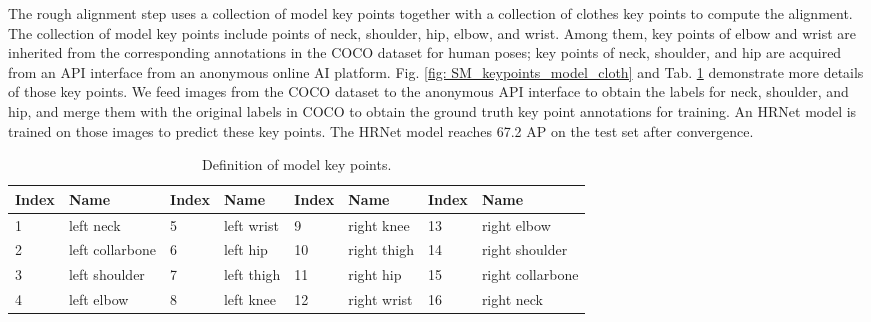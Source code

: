 \documentclass[10pt,twocolumn,letterpaper]{article}
\begin{document}
The rough alignment step uses a collection of model key points together with a collection of clothes key points to compute the alignment. The collection of model key points include points of neck, shoulder, hip, elbow, and wrist. Among them, key points of elbow and wrist are inherited from the corresponding annotations in the COCO \cite{lin2014microsoft} dataset for human poses; key points of neck, shoulder, and hip are acquired from an API interface from an anonymous online AI platform. Fig. \ref{fig: SM_keypoints_model_cloth} and Tab. \ref{tab:model_keypoints} demonstrate more details of those key points. 
We feed images from the COCO dataset to the anonymous API interface to obtain the labels for neck, shoulder, and hip, and merge them with the original labels in COCO to obtain the ground truth key point annotations for training. 
An HRNet \cite{sun2019deep} model is trained on those images to predict these key points. The HRNet model reaches 67.2 AP on the test set after convergence. 






\begin{table}[h]
    \caption{Definition of model key points.}
    \label{tab:model_keypoints}
    \centering
    \begin{tabular}{llllllll}
        \toprule
        Index & Name & Index & Name & Index & Name & Index & Name \\ 
        \midrule
        1 & left neck & 5 & left wrist & 9 & right knee & 13 & right elbow \\ 
        2 & left collarbone & 6 & left hip & 10 & right thigh & 14 & right shoulder\\ 
        3 & left shoulder & 7 & left thigh &  11 & right hip & 15 & right collarbone \\ 
        4 & left elbow & 8 & left knee & 12 & right wrist & 16 & right neck \\ 
        \bottomrule
    \end{tabular}
\end{table}
\end{document}
